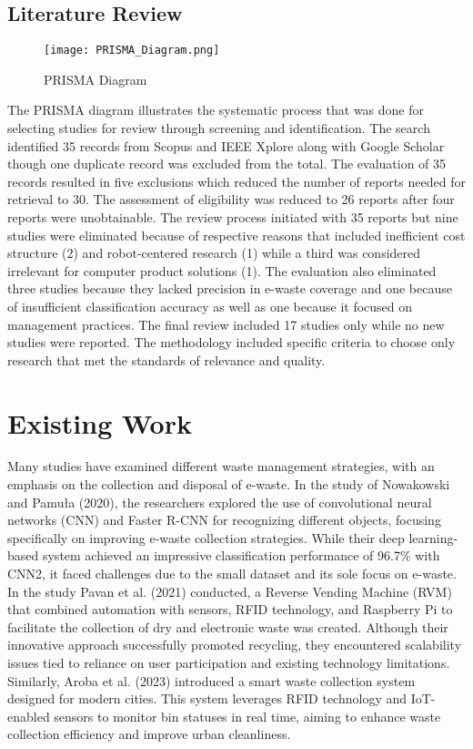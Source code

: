 \subsection{Literature Review}

\begin{figure}[!htbp]
	\centering
		\texttt{[image: PRISMA\_Diagram.png]}
	\caption{PRISMA Diagram}
	\label{fig:Literature Review} %
\end{figure}

The PRISMA diagram illustrates the 	systematic process that was done for selecting studies for review through screening and identification. The search identified 35 records from Scopus and IEEE Xplore along with Google Scholar though one duplicate record was excluded from the total. The evaluation of 35 records resulted in five exclusions which reduced the number of reports needed for retrieval to 30. The assessment of eligibility was reduced to 26 reports after four reports were unobtainable. The review process initiated with 35 reports but nine studies were eliminated because of respective reasons that included inefficient cost structure (2) and robot-centered research (1) while a third was considered irrelevant for computer product solutions (1). The evaluation also eliminated three studies because they lacked precision in e-waste coverage and one because of insufficient classification accuracy as well as one because it focused on management practices. The final review included 17 studies only while no new studies were reported. The methodology included specific criteria to choose only research that met the standards of relevance and quality.

\section{Existing Work}
Many studies have examined different waste management strategies, with an emphasis on the collection and disposal of e-waste. In the study of Nowakowski and Pamuła (2020), the researchers explored the use of convolutional neural networks (CNN) and Faster R-CNN for recognizing different objects, focusing specifically on improving e-waste collection strategies. While their deep learning-based system achieved an impressive classification performance of 96.7\% with CNN2, it faced challenges due to the small dataset and its sole focus on e-waste. In the study Pavan et al. (2021) conducted, a Reverse Vending Machine (RVM) that combined automation with sensors, RFID technology, and Raspberry Pi to facilitate the collection of dry and electronic waste was created. Although their innovative approach successfully promoted recycling, they encountered scalability issues tied to reliance on user participation and existing technology limitations. Similarly, Aroba et al. (2023) introduced a smart waste collection system designed for modern cities. This system leverages RFID technology and IoT-enabled sensors to monitor bin statuses in real time, aiming to enhance waste collection efficiency and improve urban cleanliness. 

